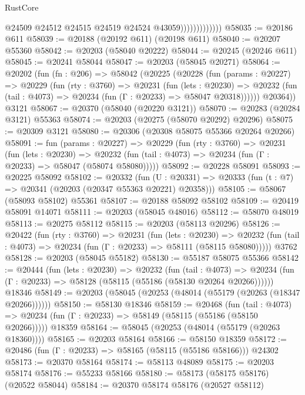 \begin{lexlean}{RustCore}
\begin{coremodule}
                              @24509
                              @24512
                              @24515
                              @24519
                              @24524
                              @43059)))))))))))))
@58035 := @20186 @611
@58039 := @20188 (@20192 @611) (@20198 @611)
@58040 := @20207 @55360
@58042 := @20203 (@58040 @20222)
@58044 := @20245 (@20246 @611)
@58045 := @20241 @58044
@58047 := @20203 (@58045 @20271)
@58064 := @20202
    (fun (fn : @206) =>
    @58042
      (@20225
        (@20228
          (fun (params : @20227) =>
          @20229
            (fun (rty : @3760) =>
            @20231
              (fun (lets : @20230) =>
              @20232 (fun (tail : @4073) => @20234 (fun (Γ : @20233) => @58047 @20318))))))
        @20364))
    @3121
@58067 := @20370 (@58040 (@20220 @3121))
@58070 := @20283 (@20284 @3121) @55363
@58074 := @20203 (@20275 (@58070 @20292) @20296)
@58075 := @20309 @3121
@58080 := @20306 (@20308 @58075 @55366 @20264 @20266)
@58091 := fun (params : @20227) =>
  @20229
    (fun (rty : @3760) =>
    @20231
      (fun (lets : @20230) =>
      @20232 (fun (tail : @4073) => @20234 (fun (Γ : @20233) => @58047 (@58074 @58080)))))
@58092 := @20228 @58091
@58093 := @20225 @58092
@58102 := @20332
    (fun (U : @20331) => @20333 (fun (t : @7) => @20341 (@20203 (@20347 @55363 @20221) @20358)))
@58105 := @58067 (@58093 @58102) @55361
@58107 := @20188 @58092 @58102
@58109 := @20419 @58091 @14071
@58111 := @20203 (@58045 @48016)
@58112 := @58070 @48019
@58113 := @20275 @58112
@58115 := @20203 (@58113 @20296)
@58126 := @20422
    (fun (rty : @3760) =>
    @20231
      (fun (lets : @20230) =>
      @20232 (fun (tail : @4073) => @20234 (fun (Γ : @20233) => @58111 (@58115 @58080)))))
    @3762
@58128 := @20203 (@58045 @55182)
@58130 := @55187 @58075 @55366
@58142 := @20444
    (fun (lets : @20230) =>
    @20232
      (fun (tail : @4073) =>
      @20234 (fun (Γ : @20233) => @58128 (@58115 (@55186 (@58130 @20264 @20266))))))
    @18346
@58149 := @20203 (@58045 (@20253 (@48014 (@55179 (@20263 (@18347 @20266))))))
@58150 := @58130 @18346
@58159 := @20468
    (fun (tail : @4073) => @20234 (fun (Γ : @20233) => @58149 (@58115 (@55186 (@58150 @20266)))))
    @18359
@58164 := @58045 (@20253 (@48014 (@55179 (@20263 @18360))))
@58165 := @20203 @58164
@58166 := @58150 @18359
@58172 := @20486 (fun (Γ : @20233) => @58165 (@58115 (@55186 @58166))) @24302
@58173 := @20370 @58164
@58174 := @58113 @48089
@58175 := @20203 @58174
@58176 := @55233 @58166
@58180 := @58173 (@58175 @58176) (@20522 @58044)
@58184 := @20370 @58174 @58176 (@20527 @58112)

\end{coremodule}
\end{lexlean}
